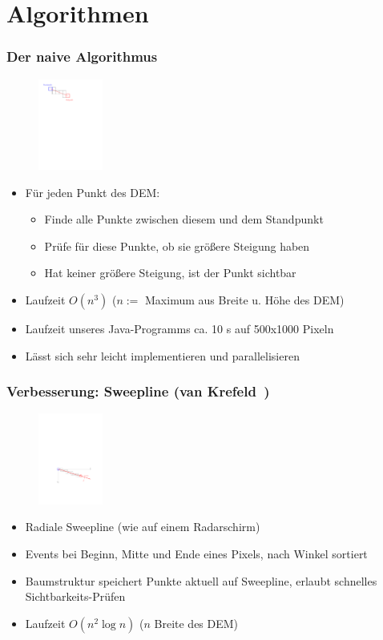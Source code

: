 \documentclass{beamer}
\begin{document}
\section{Algorithmen}

\begin{frame}
  \frametitle{Der naive Algorithmus}
  \begin{figure}[h]
    \centering
    \includegraphics[height=3cm]{naive}
    \label{fig:naive}
  \end{figure}
  \begin{itemize}
    \item Für jeden Punkt des DEM:
    \begin{itemize}
      \item Finde alle Punkte zwischen diesem und dem Standpunkt
      \item Prüfe für diese Punkte, ob sie größere Steigung haben
      \item Hat keiner größere Steigung, ist der Punkt sichtbar
    \end{itemize}
    \item<2-> Laufzeit $O(n^3)$ ($n :=$ Maximum aus Breite u. Höhe des DEM)
    \item<3-> Laufzeit unseres Java-Programms ca. 10 s auf 500x1000 Pixeln
    \item<4-> Lässt sich sehr leicht implementieren und parallelisieren
  \end{itemize}
\end{frame}


\begin{frame}
  \frametitle{Verbesserung: Sweepline (van Krefeld~\cite{van1996variations})}
  \begin{figure}[h]
    \centering
    \includegraphics[height=3cm]{Sweep.pdf}
    \label{fig:sweepline}
  \end{figure}
  \begin{itemize}
    \item Radiale Sweepline (wie auf einem Radarschirm)
    \item Events bei Beginn, Mitte und Ende eines Pixels, nach Winkel sortiert
    \item Baumstruktur speichert Punkte aktuell auf Sweepline, erlaubt schnelles Sichtbarkeits-Prüfen
    \item<2-> Laufzeit $O(n^2 \log{n})$ ($n$ Breite des DEM)
  \end{itemize}
\end{frame}
\end{document}

